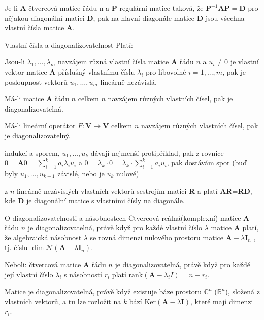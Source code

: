 \begin{dusledek}
Je-li \textbf{A} čtvercová matice řádu n a \textbf{P} regulární matice taková, že $\textbf{P}^{-1}\textbf{A}\textbf{P}=\textbf{D}$ pro nějakou diagonální matici \textbf{D}, pak na hlavní diagonále matice \textbf{D} jsou všechna vlastní čísla matice \textbf{A}.
\end{dusledek}

\begin{vetaN}{Vlastní čísla a diagonalizovatelnost}
Platí:
\begin{penumerate}
    \item Jsou-li $\lambda_1,...,\lambda_m$ navzájem různá vlastní čísla matice \textbf{A} řádu $n$ a $u_i\neq0$ je vlastní vektor matice \textbf{A} příslušný vlastnímu číslu $\lambda_i$ pro libovolné $i=1,...,m$, pak je posloupnost vektorů $u_1,\dots,u_m$ lineárně nezávislá.

    \item Má-li matice \textbf{A} řádu $n$ celkem $n$ navzájem různých vlastních čísel, pak je diagonalizovatelná.

    \item Má-li lineární operátor $F:\textbf{V}\rightarrow\textbf{V}$ celkem $n$ navzájem různých vlastních čísel, pak je diagonalizovatelný.
\end{penumerate}

\medskip
\begin{dukaz}
\begin{penumerate}
    \item indukcí a sporem, $u_1,\dots,u_k$ dávají nejmenší protipříklad, pak z rovnice $0=\mathbf{A}0=\sum_{i=1}^k a_i\lambda_iu_i$ a $0=\lambda_k\cdot 0=\lambda_k\cdot\sum_{i=1}^k a_i u_i$, pak dostávám spor (buď byly $u_1,\dots,u_{k-1}$ závislé, nebo je $u_k$ nulové)
    \item z $n$ lineárně nezávislých vlastních vektorů sestrojím matici \textbf{R} a platí \textbf{AR}=\textbf{RD}, kde \textbf{D} je diagonální matice s vlastními čísly na diagonále.
\end{penumerate}
\end{dukaz}
\end{vetaN}

\begin{vetaN}{O diagonalizovatelnosti a násobnostech}
Čtvercová reálná(komplexní) matice \textbf{A} řádu $n$ je diagonalizovatelná, právě když pro každé vlastní číslo $\lambda$ matice \textbf{A} platí, že algebraická násobnost $\lambda$ se rovná dimenzi nulového prostoru matice $\textbf{A}-\lambda \textbf{I}_n$ , tj. číslu $\dim \mathcal{N}(\textbf{A}-\lambda \textbf{I}_n)$.

Neboli: čtvercová matice \textbf{A} řádu $n$ je diagonalizovatelná, právě když pro každé její vlastní číslo $\lambda_i$ s násobností $r_i$ platí $\mathrm{rank}(\mathbf{A}-\lambda_i I)=n-r_i$.

\medskip
\begin{dukaz}
Matice je diagonalizovatelná, právě když existuje báze prostoru $\mathbb{C}^n$ ($\mathbb{R}^n$), složená z vlastních vektorů, a tu lze rozložit na $k$ bází $\mathrm{Ker}(\textbf{A}-\lambda\textbf{I})$, které mají dimenzi $r_i$.
\end{dukaz}
\end{vetaN}

